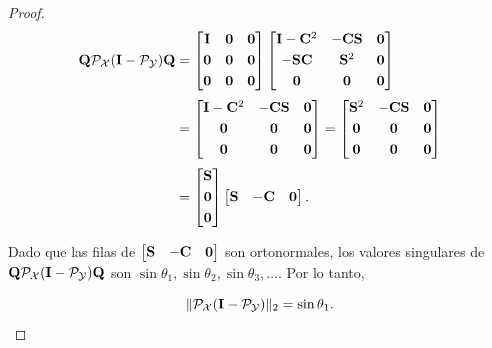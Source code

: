 \begin{proof}
            \[\begin{aligned} \mathbf{Q}\mathcal{P}_{\mathcal{X}}(\mathbf{I}-\mathcal{P}_{\mathcal{Y}})\mathbf{Q} & = \begin{bmatrix} \mathbf{I} & \mathbf{0} & \mathbf{0}\\[0.3em] \mathbf{0} & \mathbf{0} & \mathbf{0}\\[0.3em] \mathbf{0} & \mathbf{0} & \mathbf{0}
            \end{bmatrix}\begin{bmatrix} \mathbf{I} - \mathbf{C}^2 & -\mathbf{C}\mathbf{S} & \mathbf{0}\\[0.3em] -\mathbf{S}\mathbf{C} & \mathbf{S}^2 & \mathbf{0}\\[0.3em] \mathbf{0} & \mathbf{0} & \mathbf{0}
            \end{bmatrix}\\[0.3em]
            & = \begin{bmatrix} \mathbf{I} - \mathbf{C}^2 & -\mathbf{C}\mathbf{S} & \mathbf{0}\\[0.3em] \mathbf{0} & \mathbf{0} & \mathbf{0}\\[0.3em] \mathbf{0} & \mathbf{0} & \mathbf{0}
            \end{bmatrix} = \begin{bmatrix} \mathbf{S}^2 & -\mathbf{C}\mathbf{S} & \mathbf{0}\\[0.3em] \mathbf{0} & \mathbf{0} & \mathbf{0}\\[0.3em] \mathbf{0} & \mathbf{0} & \mathbf{0}
            \end{bmatrix}\\[0.3em]
            & = \begin{bmatrix}\mathbf{S}\\[0.3em]\mathbf{0}\\[0.3em] \mathbf{0}\end{bmatrix}\begin{bmatrix} \mathbf{S} & -\mathbf{C} & \mathbf{0} 
            \end{bmatrix}. \end{aligned}\]

            Dado que las filas de $\begin{bmatrix} \mathbf{S} & -\mathbf{C} & \mathbf{0} 
            \end{bmatrix}$ son ortonormales, los valores singulares de $\mathbf{Q}\mathcal{P}_{\mathcal{X}}(\mathbf{I}-\mathcal{P}_{\mathcal{Y}})\mathbf{Q}$ son $\sin\theta_1,\sin\theta_2,\sin\theta_3,\ldots$. Por lo tanto,
            
            \begin{equation}\|\mathcal{P}_{\mathcal{X}}(\mathbf{I}-\mathcal{P}_{\mathcal{Y}})\|_2 = \sin\theta_1.\label{Eq:appendix_sin1}\end{equation}


\end{proof}
